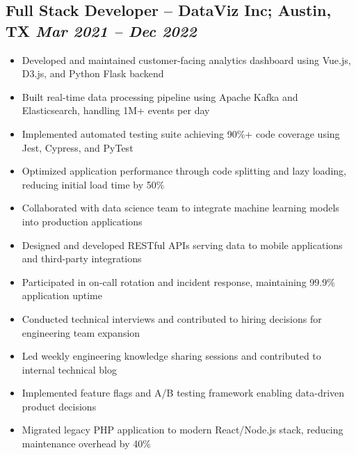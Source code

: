 \documentclass[a4paper,10pt]{article}           %
\begin{document}
    \subsection*{Full Stack Developer – DataViz Inc; Austin, TX \hfill \textit{Mar 2021 – Dec 2022}}
    \vspace{-0.5em}
    \begin{itemize}[leftmargin=0.2cm, itemsep=0pt, label=--]
        \item Developed and maintained customer-facing analytics dashboard using Vue.js, D3.js, and Python Flask backend
        \item Built real-time data processing pipeline using Apache Kafka and Elasticsearch, handling 1M+ events per day
        \item Implemented automated testing suite achieving 90\%+ code coverage using Jest, Cypress, and PyTest
        \item Optimized application performance through code splitting and lazy loading, reducing initial load time by 50\%
        \item Collaborated with data science team to integrate machine learning models into production applications
        \item Designed and developed RESTful APIs serving data to mobile applications and third-party integrations
        \item Participated in on-call rotation and incident response, maintaining 99.9\% application uptime
        \item Conducted technical interviews and contributed to hiring decisions for engineering team expansion
        \item Led weekly engineering knowledge sharing sessions and contributed to internal technical blog
        \item Implemented feature flags and A/B testing framework enabling data-driven product decisions
        \item Migrated legacy PHP application to modern React/Node.js stack, reducing maintenance overhead by 40\%
    \end{itemize}
\end{document}
